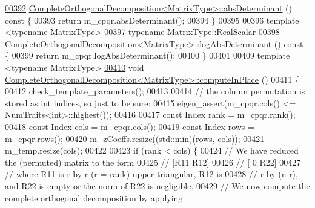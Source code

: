 \begin{DoxyCode}
\hyperlink{group___q_r___module_ac040c34ce3fb2b68d3f57adc0c29d526}{00392} \hyperlink{group___q_r___module_ac040c34ce3fb2b68d3f57adc0c29d526}{CompleteOrthogonalDecomposition<MatrixType>::absDeterminant}
      ()\textcolor{keyword}{ const }\{
00393   \textcolor{keywordflow}{return} m\_cpqr.absDeterminant();
00394 \}
00395 
00396 \textcolor{keyword}{template} <\textcolor{keyword}{typename} MatrixType>
00397 \textcolor{keyword}{typename} MatrixType::RealScalar
\hyperlink{group___q_r___module_ad59d6dc78dab52a0038ac372b4a72c0d}{00398} \hyperlink{group___q_r___module_ad59d6dc78dab52a0038ac372b4a72c0d}{CompleteOrthogonalDecomposition<MatrixType>::logAbsDeterminant}
      ()\textcolor{keyword}{ const }\{
00399   \textcolor{keywordflow}{return} m\_cpqr.logAbsDeterminant();
00400 \}
00401 
00409 \textcolor{keyword}{template} <\textcolor{keyword}{typename} MatrixType>
\hyperlink{group___q_r___module_adb0b963d7d8f96492904e8eda03efbf5}{00410} \textcolor{keywordtype}{void} \hyperlink{group___q_r___module_adb0b963d7d8f96492904e8eda03efbf5}{CompleteOrthogonalDecomposition<MatrixType>::computeInPlace}
      ()
00411 \{
00412   check\_template\_parameters();
00413 
00414   \textcolor{comment}{// the column permutation is stored as int indices, so just to be sure:}
00415   eigen\_assert(m\_cpqr.cols() <= \hyperlink{group___core___module_struct_eigen_1_1_num_traits}{NumTraits<int>::highest}());
00416 
00417   \textcolor{keyword}{const} \hyperlink{namespace_eigen_a62e77e0933482dafde8fe197d9a2cfde}{Index} rank = m\_cpqr.rank();
00418   \textcolor{keyword}{const} \hyperlink{namespace_eigen_a62e77e0933482dafde8fe197d9a2cfde}{Index} cols = m\_cpqr.cols();
00419   \textcolor{keyword}{const} \hyperlink{namespace_eigen_a62e77e0933482dafde8fe197d9a2cfde}{Index} rows = m\_cpqr.rows();
00420   m\_zCoeffs.resize((std::min)(rows, cols));
00421   m\_temp.resize(cols);
00422 
00423   \textcolor{keywordflow}{if} (rank < cols) \{
00424     \textcolor{comment}{// We have reduced the (permuted) matrix to the form}
00425     \textcolor{comment}{//   [R11 R12]}
00426     \textcolor{comment}{//   [ 0  R22]}
00427     \textcolor{comment}{// where R11 is r-by-r (r = rank) upper triangular, R12 is}
00428     \textcolor{comment}{// r-by-(n-r), and R22 is empty or the norm of R22 is negligible.}
00429     \textcolor{comment}{// We now compute the complete orthogonal decomposition by applying}

\end{DoxyCode}

